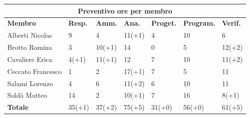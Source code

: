 \documentclass[a4paper, 12pt]{article}
\begin{document}
\begin{center}
	\begin{tabularx}{\textwidth}{|X|X|X|X|X|X|X|}
		\hline
		\multicolumn{7}{|c|}{\textbf{Preventivo ore per membro}}                                           \\
		\hline
		\hline
		\textbf{Membro}   & \textbf{Resp.}    & \textbf{Amm.}   & \textbf{Ana.} &
		\textbf{Proget.}  & \textbf{Program.} & \textbf{Verif.}                                            \\
		\hline
		Alberti Nicolas   & 9                 & 4               & 11(+1)        & 4      & 10     & 6      \\
		\hline
		Brotto Romina     & 3                 & 10(+1)          & 14            & 0      & 5      & 12(+2) \\
		\hline
		Cavaliere Erica   & 4(+1)             & 11(+1)          & 12            & 7      & 10     & 11(+2) \\
		\hline
		Ceccato Francesco & 1                 & 2               & 17(+1)        & 7      & 5      & 11     \\
		\hline
		Salami Lorenzo    & 4                 & 6               & 11(+2)        & 6      & 10     & 11     \\
		\hline
		Soldà Matteo      & 14                & 2               & 10(+1)        & 7      & 16     & 8(+1)  \\
		\hline
		\hline
		\textbf{Totale}   & 35(+1)            & 37(+2)          & 75(+5)        & 31(+0) & 56(+0) & 61(+5) \\
		\hline
	\end{tabularx}\\[8pt]
	\mbox{}\\
\end{center}

\newpage
\end{document}
